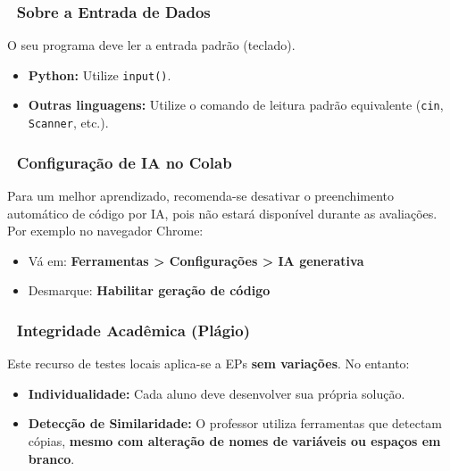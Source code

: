 \documentclass[
  portuguese,
  letterpaper,
  openany,
  oneside,
  12pt,
  a4paper]{book}
\providecommand{\tightlist}{%
  \setlength{\itemsep}{0pt}\setlength{\parskip}{0pt}}
\begin{document}
\subsubsection*{🔹 Sobre a Entrada de
Dados}\label{sobre-a-entrada-de-dados}

O seu programa deve ler a entrada padrão (teclado).

\begin{itemize}
\tightlist
\item
  \textbf{Python:} Utilize \texttt{input()}.
\item
  \textbf{Outras linguagens:} Utilize o comando de leitura padrão
  equivalente (\texttt{cin}, \texttt{Scanner}, etc.).
\end{itemize}

\subsubsection*{🔹 Configuração de IA no
Colab}\label{configurauxe7uxe3o-de-ia-no-colab}

Para um melhor aprendizado, recomenda-se desativar o preenchimento
automático de código por IA, pois não estará disponível durante as
avaliações. Por exemplo no navegador Chrome:

\begin{itemize}
\tightlist
\item
  Vá em: \textbf{Ferramentas \textgreater{} Configurações \textgreater{}
  IA generativa}
\item
  Desmarque: \textbf{Habilitar geração de código}
\end{itemize}

\subsubsection*{🔹 Integridade Acadêmica
(Plágio)}\label{integridade-acaduxeamica-pluxe1gio}

Este recurso de testes locais aplica-se a EPs \textbf{sem variações}. No
entanto:

\begin{itemize}
\tightlist
\item
  \textbf{Individualidade:} Cada aluno deve desenvolver sua própria
  solução.
\item
  \textbf{Detecção de Similaridade:} O professor utiliza ferramentas que
  detectam cópias, \textbf{mesmo com alteração de nomes de variáveis ou
  espaços em branco}.
\end{itemize}
\end{document}
